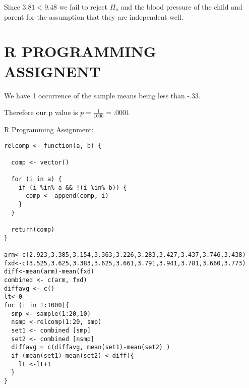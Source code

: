\documentclass[svgnames]{article}
\begin{document}
Since $3.81<9.48$ we fail to reject $H_o$ and the blood pressure of the child and parent for the assumption that they are independent well.

\section{R PROGRAMMING ASSIGNENT}
We have 1 occurrence of the sample means being less than -.33.

Therefore our p value is $p=\frac{1}{1000}=.0001$
 
R Programming Assignment:
\begin{lstlisting}
relcomp <- function(a, b) {
  
  comp <- vector()
  
  for (i in a) {
    if (i %in% a && !(i %in% b)) {
      comp <- append(comp, i)
    }
  }
  
  return(comp)
}

arm<-c(2.923,3.385,3.154,3.363,3.226,3.283,3.427,3.437,3.746,3.438)
fxd<-c(3.525,3.625,3.383,3.625,3.661,3.791,3.941,3.781,3.660,3.773)
diff<-mean(arm)-mean(fxd)
combined <- c(arm, fxd)
diffavg <- c()
lt<-0
for (i in 1:1000){
  smp <- sample(1:20,10)
  nsmp <-relcomp(1:20, smp)
  set1 <- combined [smp]
  set2 <- combined [nsmp]
  diffavg = c(diffavg, mean(set1)-mean(set2) )
  if (mean(set1)-mean(set2) < diff){
    lt <-lt+1
  }
}
\end{lstlisting}
\end{document}
